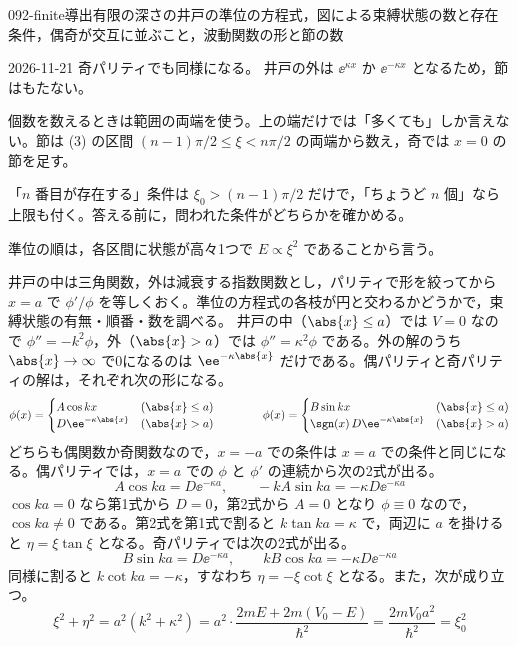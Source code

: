 \documentclass[uplatex,dvipdfmx,a4paper,11pt]{jsarticle}
\begin{document}
\begin{mondai}{092-finite}{導出}{有限の深さの井戸の準位の方程式，図による束縛状態の数と存在条件，偶奇が交互に並ぶこと，波動関数の形と節の数}
\begin{kotaeutsushi}{2026-11-21}
奇パリティでも同様になる。
井戸の外は $\ee^{\kappa x}$ か $\ee^{-\kappa x}$ となるため，節はもたない。
\end{kotaeutsushi}
\begin{kizuki}
\item {} 個数を数えるときは範囲の両端を使う。上の端だけでは「多くても」しか言えない。節は (3) の区間 $(n-1)\pi/2\le\xi<n\pi/2$ の両端から数え，奇では $x=0$ の節を足す。
\item 「$n$ 番目が存在する」条件は $\xi_{0}>(n-1)\pi/2$ だけで，「ちょうど $n$ 個」なら上限も付く。答える前に，問われた条件がどちらかを確かめる。
\item 準位の順は，各区間に状態が高々1つで $E\propto\xi^{2}$ であることから言う。
\end{kizuki}
\begin{tadashii}
\houshin 井戸の中は三角関数，外は減衰する指数関数とし，パリティで形を絞ってから $x=a$ で $\phi'/\phi$ を等しくおく。準位の方程式の各枝が円と交わるかどうかで，束縛状態の有無・順番・数を調べる。
\keisan
{} 井戸の中（$\abs{x}\le a$）では $V=0$ なので $\phi''=-k^{2}\phi$，外（$\abs{x}>a$）では $\phi''=\kappa^{2}\phi$ である。外の解のうち $\abs{x}\to\infty$ で0になるのは $\ee^{-\kappa\abs{x}}$ だけである。偶パリティと奇パリティの解は，それぞれ次の形になる。
\[ \phi(x)=\begin{cases} A\cos kx & (\abs{x}\le a)\\ D\ee^{-\kappa\abs{x}} & (\abs{x}>a)\end{cases}\qquad\qquad \phi(x)=\begin{cases} B\sin kx & (\abs{x}\le a)\\ \sgn(x)\,D\ee^{-\kappa\abs{x}} & (\abs{x}>a)\end{cases} \]
どちらも偶関数か奇関数なので，$x=-a$ での条件は $x=a$ での条件と同じになる。偶パリティでは，$x=a$ での $\phi$ と $\phi'$ の連続から次の2式が出る。
\[ A\cos ka=D\ee^{-\kappa a},\qquad -kA\sin ka=-\kappa D\ee^{-\kappa a} \]
$\cos ka=0$ なら第1式から $D=0$，第2式から $A=0$ となり $\phi\equiv 0$ なので，$\cos ka\ne 0$ である。第2式を第1式で割ると $k\tan ka=\kappa$ で，両辺に $a$ を掛けると $\eta=\xi\tan\xi$ となる。奇パリティでは次の2式が出る。
\[ B\sin ka=D\ee^{-\kappa a},\qquad kB\cos ka=-\kappa D\ee^{-\kappa a} \]
同様に割ると $k\cot ka=-\kappa$，すなわち $\eta=-\xi\cot\xi$ となる。また，次が成り立つ。
\[ \xi^{2}+\eta^{2}=a^{2}\left(k^{2}+\kappa^{2}\right)=a^{2}\cdot\frac{2mE+2m(V_{0}-E)}{\hbar^{2}}=\frac{2mV_{0}a^{2}}{\hbar^{2}}=\xi_{0}^{2} \]

\end{tadashii}
\end{mondai}
\end{document}

